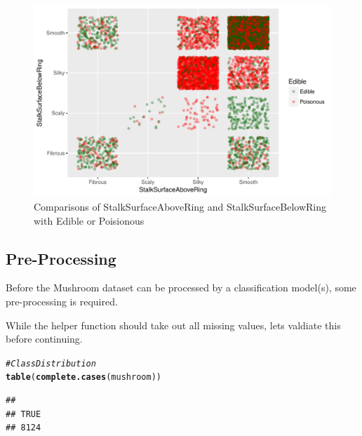 \documentclass[10pt  ,usenames, dvipsnames]{article}\usepackage[]{graphicx}\usepackage[]{color}
\makeatletter
\newcommand{\hlcom}[1]{\textcolor[rgb]{0.678,0.584,0.686}{\textit{#1}}}%
\newcommand{\hlstd}[1]{\textcolor[rgb]{0.345,0.345,0.345}{#1}}%
\newcommand{\hlkwd}[1]{\textcolor[rgb]{0.737,0.353,0.396}{\textbf{#1}}}%
\newenvironment{kframe}{%
 \def\at@end@of@kframe{}%
 \ifinner\ifhmode%
  \def\at@end@of@kframe{\end{minipage}}%
  \begin{minipage}{\columnwidth}%
 \fi\fi%
 \def\FrameCommand##1{\hskip\@totalleftmargin \hskip-\fboxsep
 \colorbox{shadecolor}{##1}\hskip-\fboxsep
     \hskip-\linewidth \hskip-\@totalleftmargin \hskip\columnwidth}%
 \MakeFramed {\advance\hsize-\width
   \@totalleftmargin\z@ \linewidth\hsize
   \@setminipage}}%
 {\par\unskip\endMakeFramed%
 \at@end@of@kframe}
\newenvironment{knitrout}{}{} %
\makeatother
\begin{document}
\begin{figure}[H]
\begin{center}
\begin{knitrout}
\color{fgcolor}
\includegraphics[width=.76\linewidth]{figure/unnamed-chunk-18-1} 

\end{knitrout}
\caption {Comparisons of StalkSurfaceAboveRing and StalkSurfaceBelowRing with Edible or Poisionous}
\label{fig3}
\end {center}
\end {figure}



\clearpage

\subsection {Pre-Processing}

Before the Mushroom dataset can be processed by a classification model(s), some pre-processing is required.

While the helper function should take out all missing values, lets valdiate this before continuing.

\begin{knitrout}
\color{fgcolor}\begin{kframe}
\begin{alltt}
\hlcom{#Class Distribution}
\hlkwd{table}\hlstd{(}\hlkwd{complete.cases} \hlstd{(mushroom))}
\end{alltt}
\end{kframe}
\end{knitrout}


\begin{knitrout}
\color{fgcolor}\begin{kframe}
\begin{verbatim}
## 
## TRUE 
## 8124
\end{verbatim}
\end{kframe}
\end{knitrout}
\end{document}
